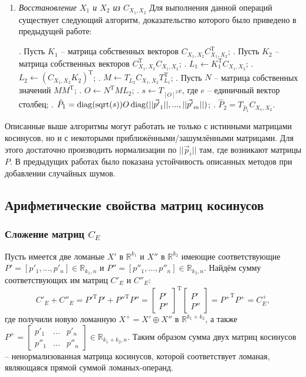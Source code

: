 \begin{enumerate}
\item \textit{Восстановление $X_1$ и $X_2$ из $C_{X_1, X_2}$}
Для выполнения данной операций существует следующий алгоритм, доказательство которого было приведено в предыдущей работе:
\begin{algorithmic}
.  Пусть $K_1$ -- матрица собственных векторов $C_{X_1,X_2}C^\mathrm{T}_{X_1,X_2}$;
.  Пусть ${K_2}$ -- матрица собственных векторов $C^\mathrm{T}_{X_1,X_2}C_{X_1,X_2}$;
.  $L_1 \gets K^\mathrm{T}_1C_{X_1,X_2}$;
.  $L_2 \gets (C_{X_1,X_2}K_2)^\mathrm{T}$;
.  $M \gets T_{L_2}C_{X_1,X_2}T^\mathrm{T}_{L_1}$;
.  Пусть $N$ -- матрица собственных значений $MM^\mathrm{T}$;
.  $O \gets N^\mathrm{T}ML_2$;
.  $s \gets T_{[O]^2}e$, где $e$ -- единичный вектор столбец;
.  $\hat{P}_1 = \operatorname{diag}(\operatorname{sqrt}(s))O\operatorname{diag}(||\vec{p'}_1||, ..., ||\vec{p'}_m||)$;
. $\hat{P}_2 = T_{\hat{P}_1}C_{X_1,X_2}$.
\end{algorithmic}
\end{enumerate}

Описанные выше алгоритмы могут работать не только с истинными матрицами косинусов, но и с некоторыми приближёнными/зашумлёнными матрицами. Для этого достаточно производить нормализации по $||\vec{p}_i||$ там, где возникают матрицы $P$. В предыдущих работах было показана устойчивость описанных методов при добавлении случайных шумов.
 
\subsection{Арифметические свойства матриц косинусов}
\subsubsection{Сложение матриц $C_E$}
Пусть имеется две ломаные $X'$ в $\mathbb{R}^{k_1}$ и $X''$ в $\mathbb{R}^{k_2}$ имеющие соответствующие $P' = [p'_1, ..., p'_n] \in \mathbb{R}_{k_1,n}$ и $P'' = [p''_1, ..., p''_n] \in \mathbb{R}_{k_2, n}$.
Найдём сумму соответствующих им матриц $C'_E$ и $C''_E$:
\begin{equation}
	C'_E + C''_E = {P'}^\mathrm{T}P' + {P''}^\mathrm{T}P'' = {\begin{bmatrix} P' \\ P'' \end{bmatrix}}^\mathrm{T}{\begin{bmatrix} P' \\ P'' \end{bmatrix}} = {P^{+}}^\mathrm{T}P^{+} = C_E^{+},
	\label{C_E_sum}
\end{equation}
где получили новую ломанную $X^{+} = X' \oplus X''$ в $\mathbb{R}^{k_1 + k_2}$, а также $P^{+} = \begin{bmatrix} p'_1 & ... & p'_n \\ p''_1 & ... & p''_n \end{bmatrix} \in \mathbb{R}_{k_1 + k_2, n}$.
Таким образом сумма двух матриц косинусов -- ненормализованная матрица косинусов, которой соответствует ломаная, являющаяся прямой суммой ломаных-операнд.

